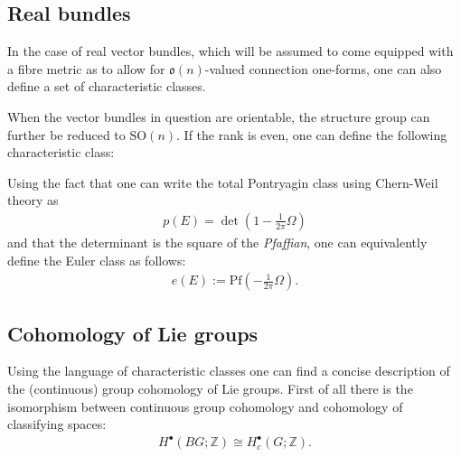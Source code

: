 \subsection{Real bundles}

    In the case of real vector bundles, which will be assumed to come equipped with a fibre metric as to allow for $\mathfrak{o}(n)$-valued connection one-forms, one can also define a set of characteristic classes.


    When the vector bundles in question are orientable, the structure group can further be reduced to $\mathrm{SO}(n)$. If the rank is even, one can define the following characteristic class:
    \begin{property}
        Using the fact that one can write the total Pontryagin class using Chern-Weil theory as
        \begin{gather}
            p(E) = \det\left(1-\frac{1}{2\pi}\Omega\right)
        \end{gather}
        and that the determinant is the square of the \textit{Pfaffian}, one can equivalently define the Euler class as follows:
        \begin{gather}
            e(E) := \mathrm{Pf}\left(-\frac{1}{2\pi}\Omega\right).
        \end{gather}
    \end{property}

\subsection{Cohomology of Lie groups}

    Using the language of characteristic classes one can find a concise description of the (continuous) group cohomology of Lie groups. First of all there is the isomorphism between continuous group cohomology and cohomology of classifying spaces:
    \begin{gather}
        H^\bullet(BG;\mathbb{Z})\cong H^\bullet_c(G;\mathbb{Z}).
    \end{gather}

